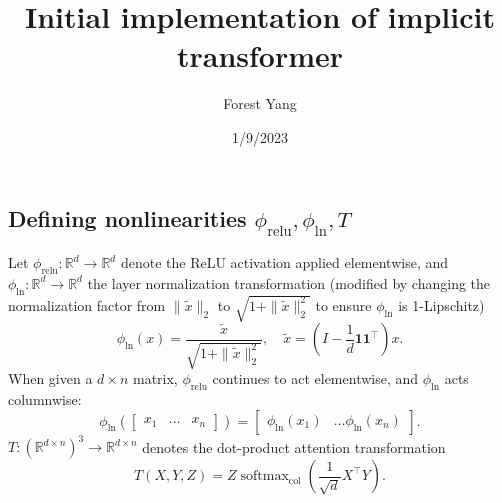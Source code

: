 \documentclass{article}
\DeclareMathOperator{\softmax}{softmax}
\begin{document}
\title{Initial implementation of implicit transformer}
\author{Forest Yang}
\date{1/9/2023}
\maketitle
\subsection{Defining nonlinearities \texorpdfstring{$\phi_\text{relu}, 
\phi_\text{ln}, T$}{}}
Let $\phi_\text{relu}:\mathbb R^d\to\mathbb R^d$ denote the ReLU activation
applied elementwise, and $\phi_\text{ln}:\mathbb R^d\to\mathbb R^d$ 
the layer normalization transformation (modified by changing the normalization
factor from $\|\tilde x\|_2$ to $\sqrt{1 + \|\tilde x\|_2^2}$ to ensure 
$\phi_\text{ln}$ is 1-Lipschitz)
\begin{equation*}
  \phi_\text{ln}(x) = \frac{\tilde x}{\sqrt{1+\|\tilde x\|_2^2}},\quad
  \tilde x = (I - \frac1d \boldsymbol1\boldsymbol1^\top)x.
\end{equation*}
When given a $d\times n$ matrix, $\phi_\text{relu}$ continues to act 
elementwise, and $\phi_\text{ln}$ acts columnwise: 
\begin{equation*}
  \phi_\text{ln}\left(\begin{bmatrix} x_1 & \ldots & x_n\end{bmatrix}\right)
    = \begin{bmatrix} \phi_\text{ln}(x_1) & \ldots \phi_\text{ln}(x_n)
    \end{bmatrix}.
\end{equation*}
$T:(\mathbb R^{d\times n})^3\to\mathbb R^{d\times n}$
denotes the dot-product attention transformation
\begin{equation*}
  T(X, Y, Z) = Z\softmax_\text{col}\left(\frac1{\sqrt d} X^\top Y\right).
\end{equation*}
\end{document}
